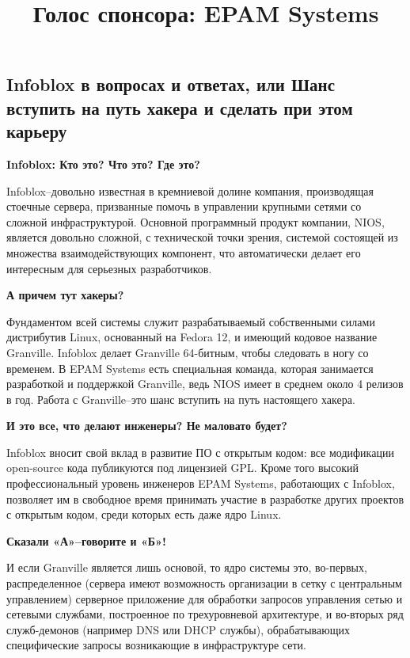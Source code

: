 \documentclass[10pt, a5paper]{article}
\begin{document}
\title{Голос спонсора: EPAM Systems}
\date{}
\maketitle

\subsection{Infoblox в вопросах и ответах, или Шанс вступить на путь хакера и сделать при этом карьеру}

\textbf{Infoblox:  Кто это? Что это? Где это?}

Infoblox--довольно известная в кремниевой долине компания, производящая стоечные 
сервера, призванные помочь в управлении крупными сетями со сложной инфраструктурой. 
Основной программный продукт компании, NIOS, является довольно сложной, с технической 
точки зрения, системой состоящей из множества взаимодействующих компонент, что 
автоматически делает его интересным для серьезных разработчиков.

\textbf{А причем тут хакеры?}

Фундаментом всей системы служит разрабатываемый собственными силами дистрибутив 
Linux, основанный на Fedora 12, и имеющий кодовое название Granville.  Infoblox делает 
Granville 64-битным, чтобы следовать в ногу со временем. В EPAM Systems есть специальная 
команда, которая занимается разработкой и поддержкой Granville, ведь NIOS имеет в среднем 
около 4 релизов в год. Работа с Granville--это шанс вступить на путь настоящего хакера.

\textbf{И это все, что делают инженеры? Не маловато будет?}

Infoblox вносит свой вклад в развитие ПО с открытым кодом: все модификации open-source 
кода публикуются под лицензией GPL. Кроме того высокий профессиональный уровень 
инженеров EPAM Systems, работающих с Infoblox, позволяет им в свободное время принимать 
участие в разработке других проектов с открытым кодом, среди которых есть даже ядро 
Linux.

\textbf{Сказали «А»--говорите и «Б»!}

И если Granville является лишь основой, то ядро системы это, во-первых, распределенное 
(сервера имеют возможность организации в сетку с центральным управлением) серверное 
приложение для обработки запросов управления сетью и сетевыми службами, построенное 
по трехуровневой архитектуре, и во-вторых ряд служб-демонов (например DNS или DHCP 
службы), обрабатывающих специфические запросы возникающие в инфраструктуре сети.
\end{document}
